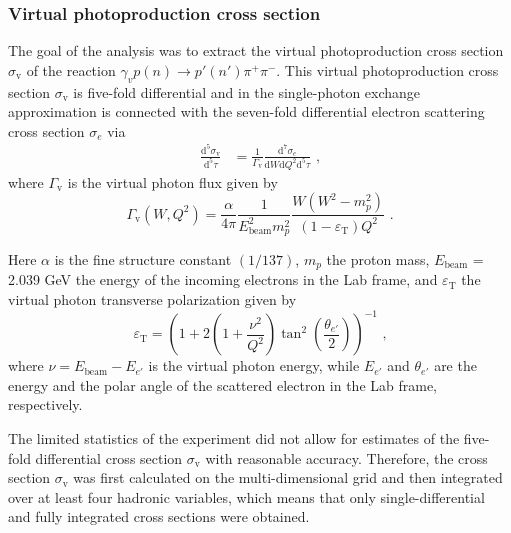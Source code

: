 \documentclass[prc,twocolumn,superscriptaddress,showpacs,amssymb,amsmath,amsfonts,aps,nofootinbib]{revtex4-1}
\begin{document}
\subsubsection{Virtual photoproduction cross section}


The goal of the analysis was to extract the virtual photoproduction cross section $\sigma_{\text{v}}$ of the reaction $\gamma_{v}p(n) \rightarrow p'(n') \pi^{+} \pi^{-}$. This virtual photoproduction cross section $\sigma_{\text{v}}$ is five-fold differential and in the single-photon exchange approximation is connected with the seven-fold differential electron scattering cross section $\sigma_{e}$ via 
\begin{equation}
\begin{aligned}
\frac{\textrm{d}^{5}\sigma_{\text{v}}}{\textrm{d}^{5}\tau} &= \frac{1}{\Gamma_{\text{v}}}\frac{\textrm{d}^{7}\sigma_{e}}{\textrm{d}W\textrm{d}Q^{2}\textrm{d}^{5}\tau}  \textrm{ ,}
\end{aligned} 
\label{fulldiff}
\end{equation}
where $\Gamma_{\text{v}}$ is the virtual photon flux given by
\begin{equation}
\Gamma_{\text{v}} (W, Q^2) =
\frac{\alpha}{4\pi}\frac{1}{E_{\text{beam}}^{2}m_{p}^{2}}\frac{W(W^{2}-m_{p}^{2})}
{(1-\varepsilon_{\text{T}})Q^{2}} \textrm{ .}
\label{flux}
\end{equation}

Here $\alpha$ is the fine structure constant $\left(1/137\right)$, $m_{p}$ the proton mass, $E_{\text{beam}}$ = 2.039 GeV the energy of the incoming electrons in the Lab frame, and $\varepsilon_{\text{T}}$ the virtual photon transverse polarization given by 
\begin{equation}
\varepsilon_{\text{T}} = \left( 1 + 2\left( 1 +
\frac{\nu^{2}}{Q^{2}} \right)
\tan^{2}\left(\frac{\theta_{e'}}{2}\right) \right)^{-1} \textrm{ ,}
\label{polarization}
\end{equation}
where $\nu = E_{\text{beam}} - E_{e'}$ is the virtual photon energy, while $E_{e'}$ and $\theta_{e'}$ are the energy and the polar angle of the scattered electron in the Lab frame, respectively. 


The limited statistics of the experiment did not allow for estimates of the five-fold differential cross section $\sigma_{\text{v}}$ with reasonable accuracy. Therefore, the cross section $\sigma_{\text{v}}$ was first calculated on the multi-dimensional grid and then integrated over at least four hadronic variables, which means that only single-differential and fully integrated cross sections were obtained.
\end{document}
